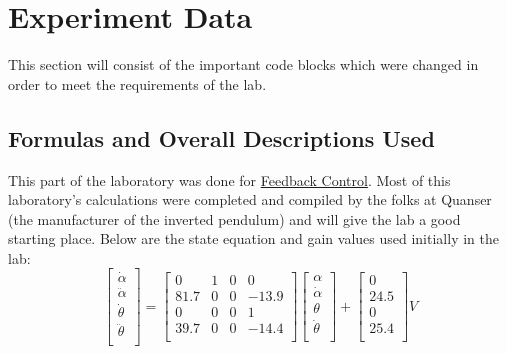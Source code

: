 \documentclass[aps,letterpaper,10pt]{revtex4}
\begin{document}
\newpage
\section{Experiment Data}
This section will consist of the important code blocks which were changed in order to meet the requirements of the lab.  \vspace{5mm}
	
	\vspace{3mm}


\subsection{Formulas and Overall Descriptions Used}
This part of the laboratory was done for \href{http://www.byui.edu/catalog/2004-2005/class.asp1075.htm}{Feedback Control}.  Most of this laboratory's calculations were completed and compiled by the folks at Quanser (the manufacturer of the inverted pendulum) and will give the lab a good starting place.  Below are the state equation and gain values used initially in the lab:
	\[
	\begin{bmatrix}
	\dot{\alpha} \\
	\ddot{\alpha} \\
	\dot{\theta} \\
	\ddot{\theta} \\
	\end{bmatrix}
	=
	\begin{bmatrix}
	0 & 1 & 0 & 0 \\
	81.7 & 0 & 0 & -13.9 \\
	0 & 0 & 0 & 1 \\
	39.7 & 0 & 0 & -14.4 \\
	\end{bmatrix}
	\begin{bmatrix}
	\alpha \\
	\dot{\alpha} \\
	\theta \\
	\dot{\theta} \\
	\end{bmatrix}
	+
	\begin{bmatrix}
	0 \\
	24.5 \\
	0 \\
	25.4 \\
	\end{bmatrix}
	V
	\]
\end{document}
